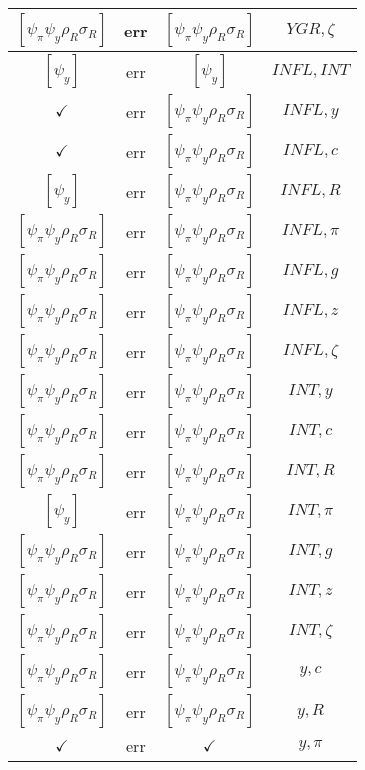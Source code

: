 \documentclass[a4paper,10pt]{article}
\begin{document}
\begin{longtable}{|c|c|c|c|}
\hline
$[\psi_\pi \psi_y \rho_R \sigma_R ]$ & err & $[\psi_\pi \psi_y \rho_R \sigma_R ]$ & ${YGR},{\zeta}$ \\
\hline
$[\psi_y ]$ & err & $[\psi_y ]$ & ${INFL},{INT}$ \\
\hline
$\checkmark$ & err & $[\psi_\pi \psi_y \rho_R \sigma_R ]$ & ${INFL},{y}$ \\
\hline
$\checkmark$ & err & $[\psi_\pi \psi_y \rho_R \sigma_R ]$ & ${INFL},{c}$ \\
\hline
$[\psi_y ]$ & err & $[\psi_\pi \psi_y \rho_R \sigma_R ]$ & ${INFL},{R}$ \\
\hline
$[\psi_\pi \psi_y \rho_R \sigma_R ]$ & err & $[\psi_\pi \psi_y \rho_R \sigma_R ]$ & ${INFL},{\pi}$ \\
\hline
$[\psi_\pi \psi_y \rho_R \sigma_R ]$ & err & $[\psi_\pi \psi_y \rho_R \sigma_R ]$ & ${INFL},{g}$ \\
\hline
$[\psi_\pi \psi_y \rho_R \sigma_R ]$ & err & $[\psi_\pi \psi_y \rho_R \sigma_R ]$ & ${INFL},{z}$ \\
\hline
$[\psi_\pi \psi_y \rho_R \sigma_R ]$ & err & $[\psi_\pi \psi_y \rho_R \sigma_R ]$ & ${INFL},{\zeta}$ \\
\hline
$[\psi_\pi \psi_y \rho_R \sigma_R ]$ & err & $[\psi_\pi \psi_y \rho_R \sigma_R ]$ & ${INT},{y}$ \\
\hline
$[\psi_\pi \psi_y \rho_R \sigma_R ]$ & err & $[\psi_\pi \psi_y \rho_R \sigma_R ]$ & ${INT},{c}$ \\
\hline
$[\psi_\pi \psi_y \rho_R \sigma_R ]$ & err & $[\psi_\pi \psi_y \rho_R \sigma_R ]$ & ${INT},{R}$ \\
\hline
$[\psi_y ]$ & err & $[\psi_\pi \psi_y \rho_R \sigma_R ]$ & ${INT},{\pi}$ \\
\hline
$[\psi_\pi \psi_y \rho_R \sigma_R ]$ & err & $[\psi_\pi \psi_y \rho_R \sigma_R ]$ & ${INT},{g}$ \\
\hline
$[\psi_\pi \psi_y \rho_R \sigma_R ]$ & err & $[\psi_\pi \psi_y \rho_R \sigma_R ]$ & ${INT},{z}$ \\
\hline
$[\psi_\pi \psi_y \rho_R \sigma_R ]$ & err & $[\psi_\pi \psi_y \rho_R \sigma_R ]$ & ${INT},{\zeta}$ \\
\hline
$[\psi_\pi \psi_y \rho_R \sigma_R ]$ & err & $[\psi_\pi \psi_y \rho_R \sigma_R ]$ & ${y},{c}$ \\
\hline
$[\psi_\pi \psi_y \rho_R \sigma_R ]$ & err & $[\psi_\pi \psi_y \rho_R \sigma_R ]$ & ${y},{R}$ \\
\hline
$\checkmark$ & err & $\checkmark$ & ${y},{\pi}$ \\

\end{longtable}
\end{document}
